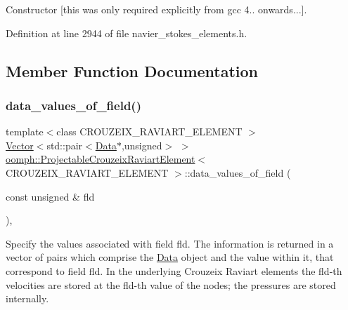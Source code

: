 Constructor \mbox{[}this was only required explicitly from gcc 4.. onwards...\mbox{]}. 



Definition at line 2944 of file navier\+\_\+stokes\+\_\+elements.\+h.



\subsection{Member Function Documentation}
\mbox{\label{classoomph_1_1ProjectableCrouzeixRaviartElement_a265001a5f6f758564d50fd498a1a9ca1}} 
\subsubsection{\texorpdfstring{data\+\_\+values\+\_\+of\+\_\+field()}{data\_values\_of\_field()}}
{\footnotesize\ttfamily template$<$class C\+R\+O\+U\+Z\+E\+I\+X\+\_\+\+R\+A\+V\+I\+A\+R\+T\+\_\+\+E\+L\+E\+M\+E\+NT $>$ \\
\hyperlink{classoomph_1_1Vector}{Vector}$<$std\+::pair$<$\hyperlink{classoomph_1_1Data}{Data}$\ast$,unsigned$>$ $>$ \hyperlink{classoomph_1_1ProjectableCrouzeixRaviartElement}{oomph\+::\+Projectable\+Crouzeix\+Raviart\+Element}$<$ C\+R\+O\+U\+Z\+E\+I\+X\+\_\+\+R\+A\+V\+I\+A\+R\+T\+\_\+\+E\+L\+E\+M\+E\+NT $>$\+::data\+\_\+values\+\_\+of\+\_\+field (\begin{DoxyParamCaption}\item[{const unsigned \&}]{fld }\end{DoxyParamCaption})\hspace{0.3cm}{\ttfamily [inline]}, {\ttfamily [virtual]}}



Specify the values associated with field fld. The information is returned in a vector of pairs which comprise the \hyperlink{classoomph_1_1Data}{Data} object and the value within it, that correspond to field fld. In the underlying Crouzeix Raviart elements the fld-\/th velocities are stored at the fld-\/th value of the nodes; the pressures are stored internally. 



